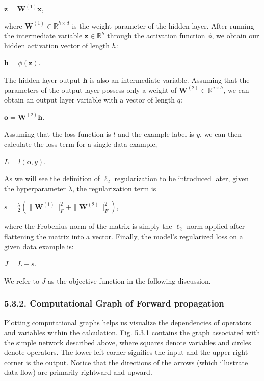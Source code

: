 \documentclass[11pt]{article}
\begin{document}
\(\mathbf{z} = \mathbf{W}^{(1)}\mathbf{x}\),

where \(\mathbf{W}^{(1)} \in \mathbb{R}^{h \times d}\) is the weight
parameter of the hidden layer. After running the intermediate variable
\(\mathbf{z} \in \mathbb{R}^{h}\) through the activation function
\(\phi\), we obtain our hidden activation vector of length \(h\):

\(\mathbf{h} = \phi(\mathbf{z})\).

The hidden layer output \(\mathbf{h}\) is also an intermediate variable.
Assuming that the parameters of the output layer possess only a weight
of \(\mathbf{W}^{(2)} \in \mathbb{R}^{q \times h}\), we can obtain an
output layer variable with a vector of length \(q\):

\(\mathbf{o} = \mathbf{W}^{(2)}\mathbf{h}\).

Assuming that the loss function is \(l\) and the example label is \(y\),
we can then calculate the loss term for a single data example,

\(L = l(\mathbf{o}, y)\).

As we will see the definition of \(\ell_2\) regularization to be
introduced later, given the hyperparameter \(\lambda\), the
regularization term is

\(s = \frac{\lambda}{2} \left( \|\mathbf{W}^{(1)}\|_F^2 + \|\mathbf{W}^{(2)}\|_F^2 \right)\),

where the Frobenius norm of the matrix is simply the \(\ell_2\) norm
applied after flattening the matrix into a vector. Finally, the model's
regularized loss on a given data example is:

\(J = L + s\).

We refer to \(J\) as the objective function in the following discussion.

    \subsubsection*{5.3.2. Computational Graph of Forward
propagation}\label{computational-graph-of-forward-propagation}

    Plotting computational graphs helps us visualize the dependencies of
operators and variables within the calculation. Fig. 5.3.1 contains the
graph associated with the simple network described above, where squares
denote variables and circles denote operators. The lower-left corner
signifies the input and the upper-right corner is the output. Notice
that the directions of the arrows (which illustrate data flow) are
primarily rightward and upward.
\end{document}
